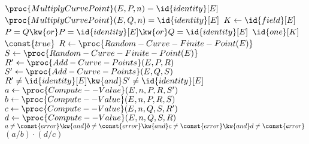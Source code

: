 \begin{algorithm}
\begin{codebox}
\li
    \Assert $\proc{MultiplyCurvePoint}(E, P, n) = \id{identity}[E]$
\li
    \Assert $\proc{MultiplyCurvePoint}(E, Q, n) = \id{identity}[E]$
\li
    $K \gets \id{field}[E]$
\li
    \If $P = Q \kw{ or } P = \id{identity}[E] \kw{ or } Q = \id{identity}[E]$
\li
        \Then
            \Return $\id{one}[K]$
        \End
\li
    \While $\const{true}$
\li
        \Do
            $R \gets \proc{Random-Curve-Finite-Point(E)}$
\li
            $S \gets \proc{Random-Curve-Finite-Point(E)}$
\li
            $R' \gets \proc{Add-Curve-Points}(E, P, R)$
\li
            $S' \gets \proc{Add-Curve-Points}(E, Q, S)$
\li
            \If $R' \neq \id{identity}[E] \kw{ and } S' \neq \id{identity}[E]$
\li
                \Then
                    $a \gets \proc{Compute--Value}(E, n, P, R, S')$
\li
                    $b \gets \proc{Compute--Value}(E, n, P, R, S)$
\li
                    $c \gets \proc{Compute--Value}(E, n, Q, S, R')$
\li
                    $d \gets \proc{Compute--Value}(E, n, Q, S, R)$
\li
                    \If $a \neq \const{error} \kw{ and } b \neq \const{error} \kw{ and } c \neq \const{error} \kw{ and } d \neq \const{error}$
\li
                        \Then
                            \Return $(a / b)\cdot(d / c)$
                        \End
                \End
        \End
\end{codebox}
\end{algorithm}

